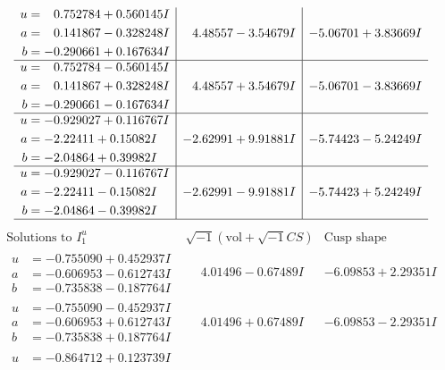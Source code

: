 \documentclass[1p]{elsarticle_modified}
\theoremstyle{definition}
\newcommand{\I}{\sqrt{-1}}
\begin{document}
$$\begin{array}{c|c|c}
\begin{aligned}
u &= \phantom{-}0.752784 + 0.560145 I \\
a &= \phantom{-}0.141867 - 0.328248 I \\
b &= -0.290661 + 0.167634 I\end{aligned}
 & \phantom{-}4.48557 - 3.54679 I & -5.06701 + 3.83669 I \\ \hline\begin{aligned}
u &= \phantom{-}0.752784 - 0.560145 I \\
a &= \phantom{-}0.141867 + 0.328248 I \\
b &= -0.290661 - 0.167634 I\end{aligned}
 & \phantom{-}4.48557 + 3.54679 I & -5.06701 - 3.83669 I \\ \hline\begin{aligned}
u &= -0.929027 + 0.116767 I \\
a &= -2.22411 + 0.15082 I \\
b &= -2.04864 + 0.39982 I\end{aligned}
 & -2.62991 + 9.91881 I & -5.74423 - 5.24249 I \\ \hline\begin{aligned}
u &= -0.929027 - 0.116767 I \\
a &= -2.22411 - 0.15082 I \\
b &= -2.04864 - 0.39982 I\end{aligned}
 & -2.62991 - 9.91881 I & -5.74423 + 5.24249 I\\
 \hline 
 \end{array}$$\newpage$$\begin{array}{c|c|c}  
\text{Solutions to }I^u_{1}& \I (\text{vol} + \sqrt{-1}CS) & \text{Cusp shape}\\
 \hline 
\begin{aligned}
u &= -0.755090 + 0.452937 I \\
a &= -0.606953 - 0.612743 I \\
b &= -0.735838 - 0.187764 I\end{aligned}
 & \phantom{-}4.01496 - 0.67489 I & -6.09853 + 2.29351 I \\ \hline\begin{aligned}
u &= -0.755090 - 0.452937 I \\
a &= -0.606953 + 0.612743 I \\
b &= -0.735838 + 0.187764 I\end{aligned}
 & \phantom{-}4.01496 + 0.67489 I & -6.09853 - 2.29351 I \\ \hline\begin{aligned}
u &= -0.864712 + 0.123739 I \\

\end{aligned}
\end{array}$$
\end{document}
